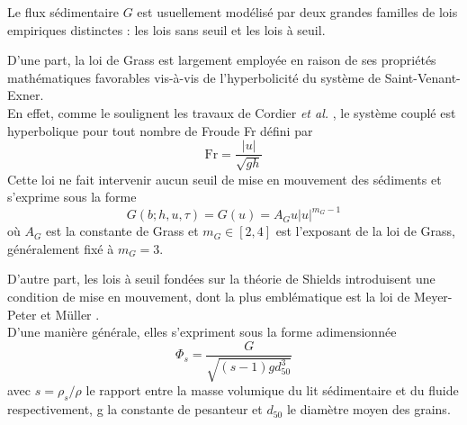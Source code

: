 \documentclass[11pt, a4paper, oneside]{report}
\begin{document}
Le flux sédimentaire $G$ est usuellement modélisé par deux grandes familles de lois empiriques distinctes : les lois sans seuil et les lois à seuil.

D'une part, la loi de Grass \cite{grass1981sediment} est largement employée en raison de ses propriétés mathématiques favorables vis-à-vis de l'hyperbolicité du système de Saint-Venant-Exner. \\
En effet, comme le soulignent les travaux de Cordier \textit{et al.} \cite{cordier2011bedload}, le système couplé est hyperbolique pour tout nombre de Froude Fr défini par
\begin{equation}
    \text{Fr} = \frac{\lvert u \rvert}{\sqrt{gh}}
\end{equation}
Cette loi ne fait intervenir aucun seuil de mise en mouvement des sédiments et s'exprime sous la forme
\begin{equation}
    G(b; h, u, \tau) = G(u) = A_G u \lvert u \rvert^{m_G - 1}
\end{equation}
où $A_G$ est la constante de Grass et $m_G \in [2, 4]$ est l'exposant de la loi de Grass, généralement fixé à $m_G = 3$.

D'autre part, les lois à seuil fondées sur la théorie de Shields \cite{shields1936application} introduisent une condition de mise en mouvement, dont la plus emblématique est la loi de Meyer-Peter et Müller \cite{meyer1948formulas}. \\
D'une manière générale, elles s'expriment sous la forme adimensionnée
\begin{equation}
    \Phi_s = \frac{G}{\sqrt{(s-1) g d_{50}^3}}
\end{equation}
avec $s = \rho_s/\rho$ le rapport entre la masse volumique du lit sédimentaire et du fluide respectivement, g la constante de pesanteur et $d_{50}$ le diamètre moyen des grains.
\end{document}
